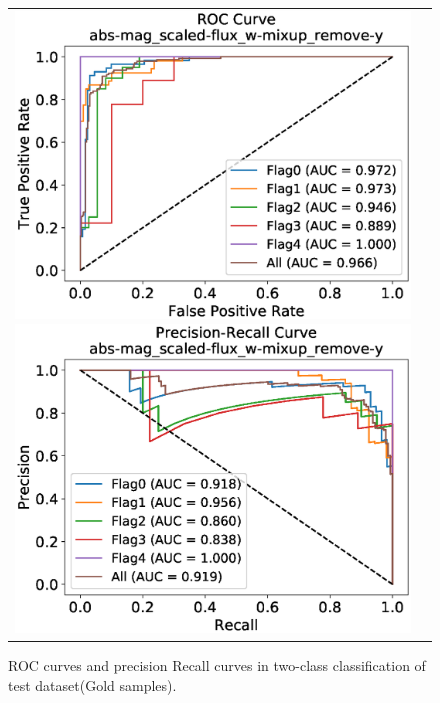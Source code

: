 \documentclass[useamsfonts]{pasj01}
\begin{document}
%
%
%
\begin{figure}[ht]
    \begin{tabular}{cc}
        \begin{minipage}{0.5\hsize}
            \begin{center}
                \includegraphics[width=\columnwidth]{figures/10_abs-mag_scaled-flux_w-mixup_remove-y_predictions_test_ROC_noedge_spec.eps}
            \end{center}
        \end{minipage}
        \begin{minipage}{0.5\hsize}
            \begin{center}
                \includegraphics[width=\columnwidth]{figures/10_abs-mag_scaled-flux_w-mixup_remove-y_predictions_test_PreRec_noedge_spec.eps}
            \end{center}
        \end{minipage}
    \end{tabular}
    \caption{%
  ROC curves and precision Recall curves in two-class classification of test dataset(Gold samples).
}%
    \label{fig:h2_test_gold}
\end{figure}
\end{document}
